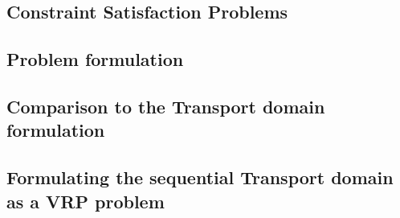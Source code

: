  \cite{NeoVrp}

\subsection{Constraint Satisfaction Problems}

\subsection{Problem formulation}

\subsection{Comparison to the Transport domain formulation}

\subsection{Formulating the sequential Transport domain as a VRP problem}

